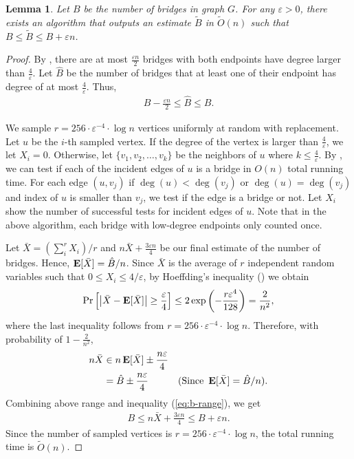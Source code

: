 \documentclass[letterpaper,11pt]{article}
\renewcommand{\epsilon}{\varepsilon}
\DeclareMathOperator{\E}{\ensuremath{\normalfont \textbf{E}}}
\newtheorem{lemma}[theorem]{Lemma}
\newenvironment{myproof}{
\vspace{-0.5cm}
\begin{proof}
}{
\end{proof}
}
\begin{document}
\begin{lemma}\label{lem:bridge-estimator}
Let $B$ be the number of bridges in graph $G$. For any $\epsilon > 0$, there exists an algorithm that outputs an estimate $\tilde{B}$ in $\tilde{O}(n)$ such that $B \leq \tilde{B} \leq B + \epsilon n$.
\end{lemma}
\begin{myproof}
By , there are at most $\frac{\epsilon n}{2}$ bridges with both endpoints have degree larger than $\frac{4}{\epsilon}$. Let $\hat{B}$ be the number of bridges that at least one of their endpoint has degree of at most $\frac{4}{\epsilon}$. Thus,
\begin{align}\label{eq:b-range}
    B - \frac{\epsilon n}{2} \leq \hat{B} \leq B.
\end{align}

We sample $r = 256\cdot \epsilon^{-4} \cdot \log n$ vertices uniformly at random with replacement. Let $u$ be the $i$-th sampled vertex. If the degree of the vertex is larger than $\frac{4}{\epsilon}$, we let $X_i = 0$. Otherwise, let $\{v_1, v_2, \ldots, v_k\}$ be the neighbors of $u$ where $k \leq \frac{4}{\epsilon}$. By , we can test if each of the incident edges of $u$ is a bridge in $O(n)$ total running time. For each edge $(u, v_j)$ if $\deg(u) < \deg(v_j)$ or $\deg(u) = \deg(v_j)$ and index of $u$ is smaller than $v_j$, we test if the edge is a bridge or not. Let $X_i$ show the number of successful tests for incident edges of $u$. Note that in the above algorithm, each bridge with low-degree endpoints only counted once. 

Let $\bar{X} = (\sum_{i}^{r} X_i) / r$ and $n\bar{X} + \frac{3\epsilon n}{4}$ be our final estimate of the number of bridges. Hence, $\E[\bar{X}] = \hat{B}/n$. Since $\bar{X}$ is the average of $r$ independent random variables such that $0 \leq X_i \leq 4/\epsilon$, by Hoeffding's inequality () we obtain
\begin{align*}
    \Pr\left[\left|\bar{X} - \E[\bar{X}]\right| \geq \frac{\epsilon}{4}\right] \leq 2\exp\left(-\frac{r\epsilon^4}{128}\right) = \frac{2}{n^2},
\end{align*}
where the last inequality follows from $r = 256\cdot \epsilon^{-4} \cdot \log n$. Therefore, with probability of $1 - \frac{2}{n^2}$,
\begin{align*}
    n\bar{X} & \in n\E[\bar{X}] \pm \frac{n\epsilon}{4}\\
    & = \hat{B} \pm \frac{n\epsilon}{4} & (\text{Since } \E[\bar{X}] = \hat{B}/n).
\end{align*}
Combining above range and inequality (\ref{eq:b-range}), we get
\begin{align*}
    B\leq n\bar{X} + \frac{3\epsilon n}{4} \leq B + \epsilon n.
\end{align*}
Since the number of sampled vertices is $r = 256\cdot \epsilon^{-4} \cdot \log n$, the total running time is $\tilde{O}(n)$.
\end{myproof}
\end{document}
